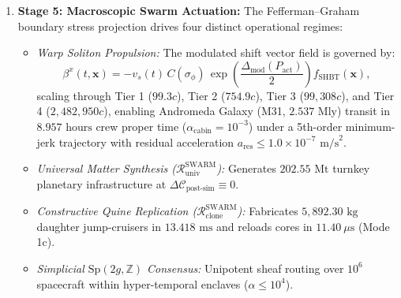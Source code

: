 \documentclass[11pt,onecolumn]{article}
\begin{document}
\begin{enumerate}
    \item \textbf{Stage 5: Macroscopic Swarm Actuation:}
    The Fefferman--Graham boundary stress projection drives four distinct operational regimes:
    \begin{itemize}
        \item \emph{Warp Soliton Propulsion:} The modulated shift vector field is governed by:
        \begin{equation}
            \beta^x(t, \mathbf{x}) = -v_s(t)\, C(\sigma_\phi)\, \exp\left(\frac{\Delta_{\text{mod}}(P_{\text{act}})}{2}\right) f_{\text{SHBT}}(\mathbf{x}),
            \label{eq:sim_beta_x}
        \end{equation}
        scaling through Tier 1 ($99.3c$), Tier 2 ($754.9c$), Tier 3 ($99{,}308c$), and Tier 4 ($2{,}482{,}950c$), enabling Andromeda Galaxy (M31, $2.537\text{ Mly}$) transit in $8.957\text{ hours}$ crew proper time ($\alpha_{\text{cabin}} = 10^{-3}$) under a 5th-order minimum-jerk trajectory with residual acceleration $a_{\text{res}} \le 1.0 \times 10^{-7}\text{ m/s}^2$.
        \item \emph{Universal Matter Synthesis ($\mathcal{R}_{\text{univ}}^{\text{SWARM}}$):} Generates $202.55\text{ Mt}$ turnkey planetary infrastructure at $\Delta \mathcal{C}_{\text{post-sim}} \equiv 0$.
        \item \emph{Constructive Quine Replication ($\mathcal{R}_{\text{clone}}^{\text{SWARM}}$):} Fabricates $5{,}892.30\text{ kg}$ daughter jump-cruisers in $13.418\text{ ms}$ and reloads cores in $11.40\ \mu\text{s}$ (Mode 1c).
        \item \emph{Simplicial $\text{Sp}(2g, \mathbb{Z})$ Consensus:} Unipotent sheaf routing over $10^6$ spacecraft within hyper-temporal enclaves ($\alpha \le 10^4$).
    \end{itemize}


\end{enumerate}
\end{document}
